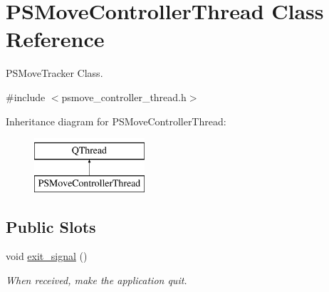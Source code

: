\hypertarget{class_p_s_move_controller_thread}{\section{P\-S\-Move\-Controller\-Thread Class Reference}
\label{class_p_s_move_controller_thread}
}


P\-S\-Move\-Tracker Class.  




{\ttfamily \#include $<$psmove\-\_\-controller\-\_\-thread.\-h$>$}

Inheritance diagram for P\-S\-Move\-Controller\-Thread\-:\begin{figure}[H]
\begin{center}
\leavevmode
\includegraphics[height=2.000000cm]{class_p_s_move_controller_thread}
\end{center}
\end{figure}
\subsection*{Public Slots}
\begin{DoxyCompactItemize}
\item 
\hypertarget{class_p_s_move_controller_thread_a03b2e15cad0f787ecf0a29684b74df3d}{void \hyperlink{class_p_s_move_controller_thread_a03b2e15cad0f787ecf0a29684b74df3d}{exit\-\_\-signal} ()}\label{class_p_s_move_controller_thread_a03b2e15cad0f787ecf0a29684b74df3d}

\begin{DoxyCompactList}\small\item\em When received, make the application quit. \end{DoxyCompactList}\end{DoxyCompactItemize}
